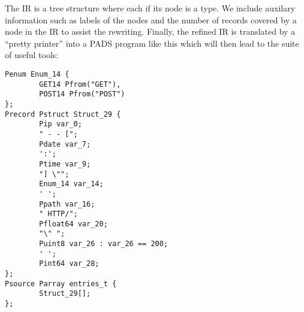 \documentclass{article}
\begin{document}
The IR is a tree structure where each if its node is a type.
We include auxilary information such as labels of the nodes
and the number of records covered by a node in the IR to assist
the rewriting. Finally, the refined IR is translated
by a ``pretty printer'' into a PADS program like this which will
then lead to the suite of useful tools:

{\small
\begin{verbatim}
Penum Enum_14 {
        GET14 Pfrom("GET"),
        POST14 Pfrom("POST")
};
Precord Pstruct Struct_29 {
        Pip var_0;
        " - - [";
        Pdate var_7;
        ':';
        Ptime var_9;
        "] \"";
        Enum_14 var_14;
        ' ';
        Ppath var_16;
        " HTTP/";
        Pfloat64 var_20;
        "\" ";
        Puint8 var_26 : var_26 == 200;
        ' ';
        Pint64 var_28;
};
Psource Parray entries_t {
        Struct_29[];
};
\end{verbatim}
}



\end{document}
